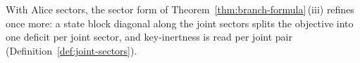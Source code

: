 
With Alice sectors, the sector form of Theorem~\ref{thm:branch-formula}\,(iii)
refines once more: a state block diagonal along the joint sectors splits the
objective into one deficit per joint sector, and key-inertness is read per
joint pair (Definition~\ref{def:joint-sectors}).

